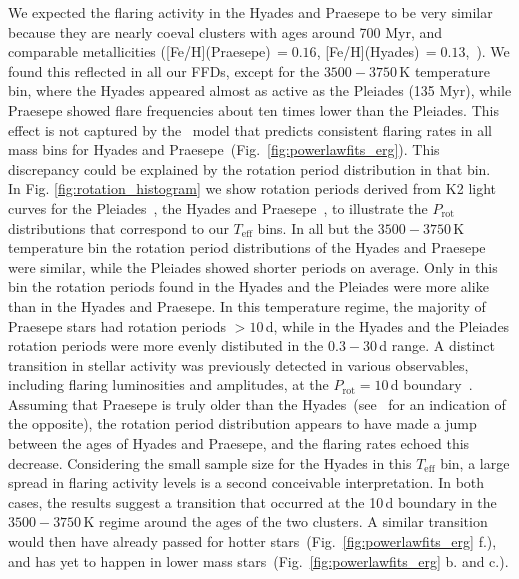 \documentclass{aa}
\begin{document}
We expected the flaring activity in the Hyades and Praesepe to be very similar because they are nearly coeval clusters with ages around 700 Myr, and comparable metallicities ([Fe/H](Praesepe)\,$=0.16$, [Fe/H](Hyades)\,$=0.13$,~\citealt{netopil_metallicities_2016}). We found this reflected in all our FFDs, except for the $3500-3750$\,K temperature bin, where the Hyades appeared almost as active as the Pleiades (135 Myr), while Praesepe showed flare frequencies about ten times lower than the Pleiades. This effect is not captured by the~\citet{davenport2019} model that predicts consistent flaring rates in all mass bins for Hyades and Praesepe~(Fig.~\ref{fig:powerlawfits_erg}). This discrepancy could be explained by the rotation period distribution in that bin. 
\\
In Fig. \ref{fig:rotation_histogram} we show rotation periods derived from K2 light curves for the Pleiades~\citep{rebull_pleiadesrot_2016}, the Hyades and Praesepe~\citep{douglas2019}, to illustrate the $P_\mathrm{rot}$ distributions that correspond to our $T_\mathrm{eff}$ bins.
In all but the $3500-3750$\,K temperature bin the rotation period distributions of the Hyades and Praesepe were similar, while the Pleiades showed shorter periods on average. Only in this bin the rotation periods found in the Hyades and the Pleiades were more alike than in the Hyades and Praesepe. In this temperature regime, the majority of Praesepe stars had rotation periods $>10$\,d, while in the Hyades and the Pleiades rotation periods were more evenly distibuted in the $0.3-30$\,d range. A distinct transition in stellar activity was previously detected in various observables, including flaring luminosities and amplitudes, at the $P_\mathrm{rot}=10$\,d boundary~\citep{stelzer2016, lu2019}. Assuming that Praesepe is truly older than the Hyades~(see~\citet{douglas2019} for an indication of the opposite), the rotation period distribution appears to have made a jump between the ages of Hyades and Praesepe, and the flaring rates echoed this decrease. Considering the small sample size for the Hyades in this $T_\mathrm{eff}$ bin, a large spread in flaring activity levels is a second conceivable interpretation. In both cases, the results suggest a transition that occurred at the 10\,d boundary in the $3500-3750$\,K regime around the ages of the two clusters. A similar transition would then have already passed for hotter stars~(Fig.~\ref{fig:powerlawfits_erg} f.), and has yet to happen in lower mass stars~(Fig.~\ref{fig:powerlawfits_erg} b. and c.).
\end{document}
